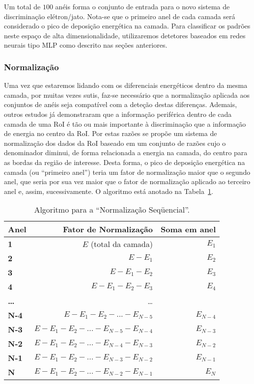 Um total de $100$ anéis forma o conjunto de entrada para o novo sistema de
discriminação elétron/jato. Nota-se que o primeiro anel de cada camada será
considerado o pico de deposição energética na camada. Para classificar os
padrões neste espaço de alta dimensionalidade, utilizaremos detetores baseados
em redes neurais tipo MLP como descrito nas seções anteriores.

\subsubsection{Normalização}

Uma vez que estaremos lidando com os diferenciais energéticos dentro da mesma
camada, por muitas vezes sutis, faz-se necessário que a normalização aplicada
aos conjuntos de anéis seja compatível com a deteção destas
diferenças. Ademais, outros estudos \cite{vassali-acat-2001} já demonstraram
que a informação periférica dentro de cada camada de uma RoI é tão ou mais
importante à discriminação que a informação de energia no centro da RoI. Por
estas razões se propõe um sistema de normalização dos dados da RoI baseado em
um conjunto de razões cujo o denominador diminui, de forma relacionada a
energia na camada, do centro para as bordas da região de interesse. Desta
forma, o pico de deposição energética na camada (ou ``primeiro anel'') teria
um fator de normalização maior que o segundo anel, que seria por sua vez maior
que o fator de normalização aplicado ao terceiro anel e, assim,
sucessivamente. O algoritmo está anotado na Tabela~\ref{tab:seq}.

\begin{table}
\renewcommand{\baselinestretch}{1.5}
\caption{Algoritmo para a ``Normalização Seqüencial''.}
\label{tab:seq}
\renewcommand{\baselinestretch}{1}
\begin{center}
\begin{tabular}{>{\bfseries}l r r}
Anel & Fator de Normalização & Soma em anel \\ \hline
1 & $E$ (total da camada) & $E_1$\\
2 & $E - E_1$ & $E_2$ \\
3 & $E - E_1 - E_2$ & $E_3$\\
4 & $E - E_1 - E_2 - E_3$ & $E_4$\\
\dots  & \dots \\
N-4 & $E - E_1 - E_2 - ... - E_{N-5}$ & $E_{N-4}$ \\
N-3 & $E - E_1 - E_2 - ... - E_{N-5} - E_{N-4}$ & $E_{N-3}$ \\
N-2 & $E - E_1 - E_2 - ... - E_{N-4} - E_{N-3}$ & $E_{N-2}$ \\
N-1 & $E - E_1 - E_2 - ... - E_{N-3} - E_{N-2}$ & $E_{N-1}$ \\
N & $E - E_1 - E_2 - ... - E_{N-2} - E_{N-1}$ & $E_N$ \\
\end{tabular}
\end{center}
\end{table}

